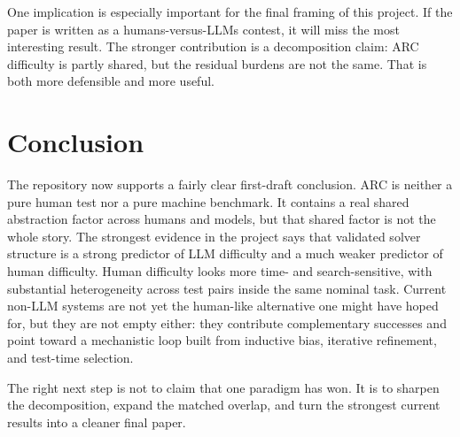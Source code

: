 \documentclass[11pt,letterpaper]{article}
\begin{document}
One implication is especially important for the final framing of this project. If the paper is written as a humans-versus-LLMs contest, it will miss the most interesting result. The stronger contribution is a decomposition claim: ARC difficulty is partly shared, but the residual burdens are not the same. That is both more defensible and more useful.

\section{Conclusion}

The repository now supports a fairly clear first-draft conclusion. ARC is neither a pure human test nor a pure machine benchmark. It contains a real shared abstraction factor across humans and models, but that shared factor is not the whole story. The strongest evidence in the project says that validated solver structure is a strong predictor of LLM difficulty and a much weaker predictor of human difficulty. Human difficulty looks more time- and search-sensitive, with substantial heterogeneity across test pairs inside the same nominal task. Current non-LLM systems are not yet the human-like alternative one might have hoped for, but they are not empty either: they contribute complementary successes and point toward a mechanistic loop built from inductive bias, iterative refinement, and test-time selection.

The right next step is not to claim that one paradigm has won. It is to sharpen the decomposition, expand the matched overlap, and turn the strongest current results into a cleaner final paper.



\end{document}
